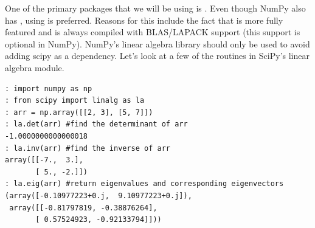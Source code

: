 One of the primary packages that we will be using is .
Even though NumPy also has , using  is preferred.  
Reasons for this include the fact that  is more fully featured and is always compiled with BLAS/LAPACK support (this support is optional in NumPy).
NumPy's linear algebra library should only be used to avoid adding scipy as a dependency.
Let's look at a few of the routines in SciPy's linear algebra module.
\begin{lstlisting}
: import numpy as np
: from scipy import linalg as la
: arr = np.array([[2, 3], [5, 7]])
: la.det(arr) #find the determinant of arr
-1.0000000000000018
: la.inv(arr) #find the inverse of arr
array([[-7.,  3.],
       [ 5., -2.]])
: la.eig(arr) #return eigenvalues and corresponding eigenvectors
(array([-0.10977223+0.j,  9.10977223+0.j]),
 array([[-0.81797819, -0.38876264],
       [ 0.57524923, -0.92133794]]))
\end{lstlisting}

